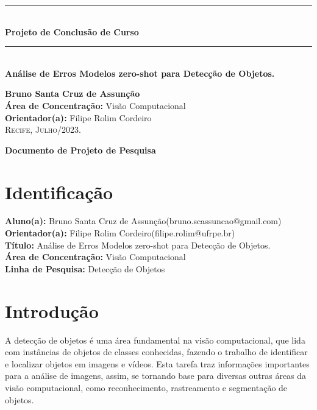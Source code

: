 \documentclass[openany, a4paper,12pt, oneside]{article}
\makeatletter
\def\myname{Bruno Santa Cruz de Assun\c{c}\~{a}o}
\def\myemail{bruno.scassuncao@gmail.com}
\def\mytitle{An\'{a}lise de Erros Modelos zero-shot para Detec\c{c}\~{a}o de Objetos.}
\def\myadvisor{Filipe Rolim Cordeiro}
\def\myadvisoremail{filipe.rolim@ufrpe.br}
\def\concentrationarea{Visão Computacional}
\def\researchline{Detec\c{c}\~{a}o de Objetos}
\makeatother
\begin{document}
\pagestyle{empty}
\begin{flushright}
  \noindent\rule{15cm}{0.4pt}\\[0.5cm]
  \textbf{{ \LARGE Projeto de Conclus\~{a}o de Curso}}\\[0.1cm]
  \noindent\rule{15cm}{0.4pt}\\[7cm]
  \textbf{\Large \mytitle}\\[4cm]
\end{flushright}

\begin{center}
  \textbf{\large \myname }\\[3cm]

  \textbf{\large \'{A}rea de Concentra\c{c}\~{a}o:} \concentrationarea\\
  \textbf{\large Orientador(a):} \myadvisor\\[2cm]
  \vfill
  \textsc{Recife, Julho/2023}.
\end{center}
\pagebreak
{}

\begin{center}
  \textbf{\large Documento de Projeto de Pesquisa}\\[1cm]
\end{center}
\section{Identifica\c{c}\~{a}o}

\textbf{Aluno(a):} \myname (\myemail)\\
\textbf{Orientador(a):} \myadvisor (\myadvisoremail)\\
\textbf{T\'{i}tulo:} \mytitle\\
\textbf{\'{A}rea de Concentra\c{c}\~{a}o:} \concentrationarea\\
\textbf{Linha de Pesquisa:} \researchline\\


\section{Introdu\c{c}\~{a}o}


A detec\c{c}\~{a}o de objetos é uma área fundamental na visão computacional, que lida com inst\^{a}ncias de objetos de classes conhecidas, fazendo o trabalho de identificar e localizar objetos em imagens e vídeos\cite{Amit2021}. Esta tarefa traz informa\c{c}\~{o}es importantes para a an\'{a}lise de imagens, assim, se tornando base para diversas outras \'{a}reas da vis\~{a}o computacional, como reconhecimento, rastreamento e segmenta\c{c}\~{a}o de objetos\cite{10028728}.
\end{document}
